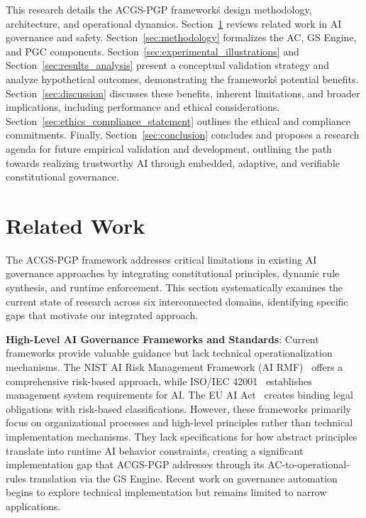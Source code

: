 \documentclass[sigconf,review,anonymous=false]{acmart} %
\begin{document}
This research details the ACGS-PGP framework\'s design methodology, architecture, and operational dynamics. Section~\ref{sec:related_work} reviews related work in AI governance and safety. Section~\ref{sec:methodology} formalizes the AC, GS Engine, and PGC components. Section~\ref{sec:experimental_illustrations} and Section~\ref{sec:results_analysis} present a conceptual validation strategy and analyze hypothetical outcomes, demonstrating the framework\'s potential benefits. Section~\ref{sec:discussion} discusses these benefits, inherent limitations, and broader implications, including performance and ethical considerations. Section~\ref{sec:ethics_compliance_statement} outlines the ethical and compliance commitments. Finally, Section~\ref{sec:conclusion} concludes and proposes a research agenda for future empirical validation and development, outlining the path towards realizing trustworthy AI through embedded, adaptive, and verifiable constitutional governance.

\section{Related Work}
\label{sec:related_work}
The ACGS-PGP framework addresses critical limitations in existing AI governance approaches by integrating constitutional principles, dynamic rule synthesis, and runtime enforcement. This section systematically examines the current state of research across six interconnected domains, identifying specific gaps that motivate our integrated approach.

\textbf{High-Level AI Governance Frameworks and Standards}: Current frameworks provide valuable guidance but lack technical operationalization mechanisms. The NIST AI Risk Management Framework (AI RMF)~\cite{NISTAIRMF23} offers a comprehensive risk-based approach, while ISO/IEC 42001~\cite{ISOIEC42001} establishes management system requirements for AI. The EU AI Act~\cite{EUAIAct24} creates binding legal obligations with risk-based classifications. However, these frameworks primarily focus on organizational processes and high-level principles rather than technical implementation mechanisms. They lack specifications for how abstract principles translate into runtime AI behavior constraints, creating a significant implementation gap that ACGS-PGP addresses through its AC-to-operational-rules translation via the GS Engine. Recent work on governance automation~\cite{AnthropicCollectiveConstitutionalAI23, VinuesaRoleAIGovernance24} begins to explore technical implementation but remains limited to narrow applications.
\end{document}
